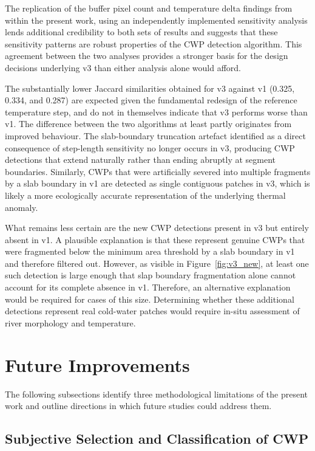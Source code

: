 The replication of the buffer pixel count and temperature delta findings from 
\citet{tonolla_thermische-kartographie_2026} within the present work, using an 
independently implemented sensitivity analysis lends 
additional credibility to both sets of results and suggests that these sensitivity 
patterns are robust properties of the CWP detection algorithm. This agreement between the two analyses 
provides a stronger basis for the design decisions underlying v3 than either 
analysis alone would afford.


The substantially lower Jaccard similarities obtained for v3 against v1 (0.325, 
0.334, and 0.287) are expected given the fundamental redesign of the reference 
temperature step, and do not in themselves indicate that v3 performs worse than 
v1. The difference between the two algorithms at least 
partly originates from improved behaviour. The slab-boundary truncation 
artefact identified as a direct consequence of step-length sensitivity no longer 
occurs in v3, producing CWP detections that extend naturally rather than ending 
abruptly at segment boundaries. Similarly, CWPs that were artificially severed 
into multiple fragments by a slab boundary in v1 are detected as 
single contiguous patches in v3, which is likely a more ecologically accurate 
representation of the underlying thermal anomaly.

What remains less certain are the new CWP detections present in v3 but entirely 
absent in v1. A plausible explanation is that these represent genuine CWPs 
that were fragmented below the minimum area threshold by a slab boundary in v1 
and therefore filtered out. However, as visible in Figure~\ref{fig:v3_new}, at 
least one such detection is large enough that slap boundary fragmentation alone 
cannot account for its complete absence in v1. Therefore, an alternative explanation 
would be required for cases of this size. Determining whether these additional 
detections represent real cold-water patches would require in-situ
assessment of river morphology and temperature.

\section{Future Improvements}

The following subsections identify three methodological limitations of the 
present work and outline directions in which future studies could address them.

\subsection{Subjective Selection and Classification of CWP}

